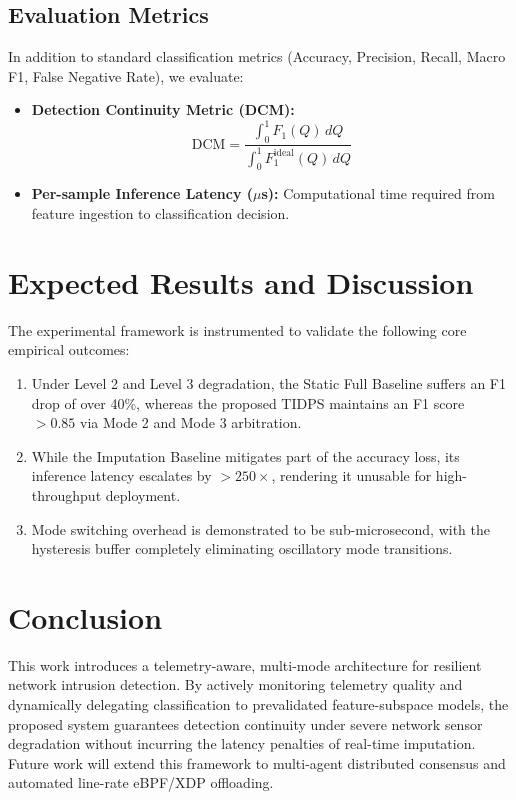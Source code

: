 \documentclass[conference]{IEEEtran}
\begin{document}
\subsection{Evaluation Metrics}
In addition to standard classification metrics (Accuracy, Precision, Recall, Macro F1, False Negative Rate), we evaluate:
\begin{itemize}
    \item \textbf{Detection Continuity Metric (DCM):}
    \begin{equation}
        \text{DCM} = \frac{\int_{0}^{1} F_1(Q) \, dQ}{\int_{0}^{1} F_1^{\text{ideal}}(Q) \, dQ}
    \end{equation}
    \item \textbf{Per-sample Inference Latency ($\mu$s):} Computational time required from feature ingestion to classification decision.
\end{itemize}

\section{Expected Results and Discussion}
The experimental framework is instrumented to validate the following core empirical outcomes:
\begin{enumerate}
    \item Under Level 2 and Level 3 degradation, the Static Full Baseline suffers an F1 drop of over 40\%, whereas the proposed TIDPS maintains an F1 score $>0.85$ via Mode 2 and Mode 3 arbitration.
    \item While the Imputation Baseline mitigates part of the accuracy loss, its inference latency escalates by $>250\times$, rendering it unusable for high-throughput deployment.
    \item Mode switching overhead is demonstrated to be sub-microsecond, with the hysteresis buffer completely eliminating oscillatory mode transitions.
\end{enumerate}

\section{Conclusion}
This work introduces a telemetry-aware, multi-mode architecture for resilient network intrusion detection. By actively monitoring telemetry quality and dynamically delegating classification to prevalidated feature-subspace models, the proposed system guarantees detection continuity under severe network sensor degradation without incurring the latency penalties of real-time imputation. Future work will extend this framework to multi-agent distributed consensus and automated line-rate eBPF/XDP offloading.



\end{document}
